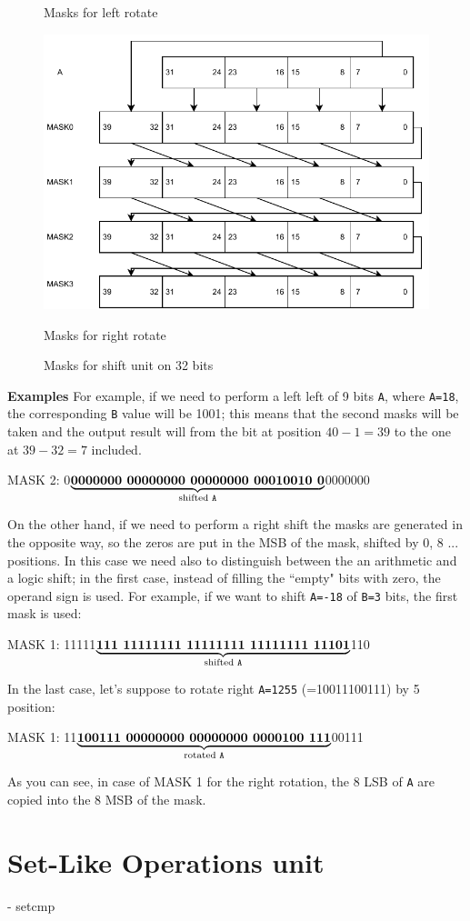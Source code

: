 \begin{figure}[h]
\begin{minipage}[b]{0.5\linewidth}
		\caption{Masks for left rotate} 
		\vspace{4ex}
	\end{minipage}%
	\begin{minipage}[b]{0.5\linewidth}
		\centering
		\includegraphics[width=.78\linewidth]{chapters/5_ExecuteStage/images/right_rotate.pdf} 
		\caption{Masks for right rotate} 
		\vspace{4ex}
	\end{minipage} 
	\caption{Masks for shift unit on 32 bits} 
\end{figure}
\begin{mybox}
	\textbf{Examples}
	\newline
	For example, if we need to perform a left left of 9 bits \texttt{A}, where \texttt{A=18}, the corresponding \texttt{B} value will be 1001; this means that the second masks will be taken and the output result will from the bit at position $40-1=39$ to the one at $39-32=7$ included.
	\begin{center}
		MASK 2: 0$\underbrace{\textbf{0000000 00000000 00000000 00010010 0}}_{\text{shifted \texttt{A}}}$0000000
	\end{center}
	
	On the other hand, if we need to perform a right shift the masks are generated in the opposite way, so the zeros are put in the MSB of the mask, shifted by 0, 8 ... positions. In this case we need also to distinguish between the an arithmetic and a logic shift; in the first case, instead of filling the ``empty" bits with zero, the operand sign is used. For example, if we want to shift \texttt{A=-18} of \texttt{B=3} bits, the first mask is used: 
	\begin{center}
		MASK 1: 11111$\underbrace{\textbf{111 11111111 11111111 11111111 11101}}_{\text{shifted \texttt{A}}}$110
	\end{center}
	
	In the last case, let's suppose to rotate right \texttt{A=1255} (=10011100111) by 5 position:
	\begin{center}
		MASK 1: 11$\underbrace{\textbf{100111 00000000 00000000 0000100 111}}_{\text{rotated \texttt{A}}}$00111
	\end{center}
	As you can see, in case of MASK 1 for the right rotation, the 8 LSB of \texttt{A} are copied into the 8 MSB of the mask.
\end{mybox}
	

\section{Set-Like Operations unit}
- setcmp